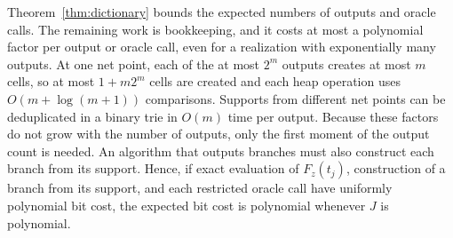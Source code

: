 Theorem~\ref{thm:dictionary} bounds the expected numbers of outputs and
oracle calls. The remaining work is bookkeeping, and it costs at most a
polynomial factor per output or oracle call, even for a realization with
exponentially many outputs. At one net point, each of the at most $2^m$
outputs creates at most $m$ cells, so at most $1+m2^m$ cells are created
and each heap operation uses $O(m+\log(m+1))$ comparisons. Supports from
different net points can be deduplicated in a binary trie in $O(m)$ time
per output. Because these factors do not grow with the number of
outputs, only the first moment of the output count is needed. An
algorithm that outputs branches must also construct each branch from its
support. Hence, if exact evaluation of $F_z(t_j)$, construction of a
branch from its support, and each restricted oracle call have uniformly
polynomial bit cost, the expected bit cost is polynomial whenever $J$ is
polynomial.
